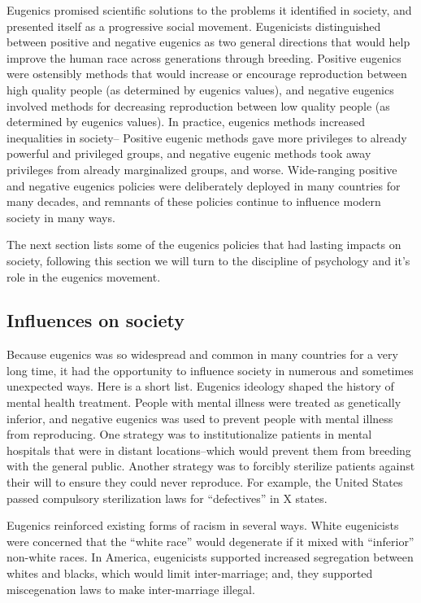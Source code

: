 \documentclass[
  oneside,
  12pt]{crumpbook}
\begin{document}
Eugenics promised scientific solutions to the problems it identified in society, and presented itself as a progressive social movement. Eugenicists distinguished between positive and negative eugenics as two general directions that would help improve the human race across generations through breeding. Positive eugenics were ostensibly methods that would increase or encourage reproduction between high quality people (as determined by eugenics values), and negative eugenics involved methods for decreasing reproduction between low quality people (as determined by eugenics values). In practice, eugenics methods increased inequalities in society-- Positive eugenic methods gave more privileges to already powerful and privileged groups, and negative eugenic methods took away privileges from already marginalized groups, and worse. Wide-ranging positive and negative eugenics policies were deliberately deployed in many countries for many decades, and remnants of these policies continue to influence modern society in many ways.

The next section lists some of the eugenics policies that had lasting impacts on society, following this section we will turn to the discipline of psychology and it's role in the eugenics movement.

\hypertarget{influences-on-society}{%
\subsection{Influences on society}\label{influences-on-society}}

Because eugenics was so widespread and common in many countries for a very long time, it had the opportunity to influence society in numerous and sometimes unexpected ways. Here is a short list. Eugenics ideology shaped the history of mental health treatment. People with mental illness were treated as genetically inferior, and negative eugenics was used to prevent people with mental illness from reproducing. One strategy was to institutionalize patients in mental hospitals that were in distant locations--which would prevent them from breeding with the general public. Another strategy was to forcibly sterilize patients against their will to ensure they could never reproduce. For example, the United States passed compulsory sterilization laws for ``defectives'' in X states.

Eugenics reinforced existing forms of racism in several ways. White eugenicists were concerned that the ``white race'' would degenerate if it mixed with ``inferior'' non-white races. In America, eugenicists supported increased segregation between whites and blacks, which would limit inter-marriage; and, they supported miscegenation laws to make inter-marriage illegal.
\end{document}
